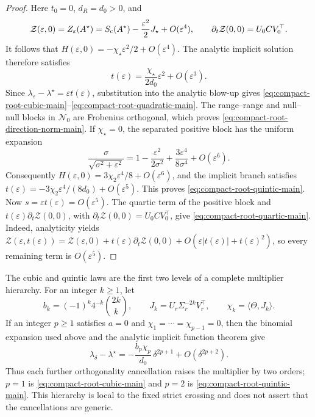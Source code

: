 \begin{proof}
Here \(t_0=0\), \(d_R=d_0>0\), and
\[
 \mathcal Z(\varepsilon,0)=Z_\varepsilon(A^\star)
 =S_{\mathrm c}(A^\star)-\frac{\varepsilon^2}{2}J_\star+O(\varepsilon^4),
 \qquad
 \partial_t\mathcal Z(0,0)=U_0CV_0^\top.
\]
It follows that
\(H(\varepsilon,0)=-\chi_\star\varepsilon^2/2+O(\varepsilon^4)\).
The analytic implicit solution therefore satisfies
\[
 t(\varepsilon)=\frac{\chi_\star}{2d_0}\varepsilon^2
 +O(\varepsilon^3).
\]
Since \(\lambda_\varepsilon-\lambda^\star=\varepsilon t(\varepsilon)\),
substitution into the analytic blow-up gives
\eqref{eq:compact-root-cubic-main}--\eqref{eq:compact-root-quadratic-main}.
The range--range and null--null blocks in \(\mathcal N_0\) are Frobenius
orthogonal, which proves \eqref{eq:compact-root-direction-norm-main}.
If \(\chi_\star=0\), the separated positive block has the uniform expansion
\[
 \frac{\sigma}{\sqrt{\sigma^2+\varepsilon^2}}
 =1-\frac{\varepsilon^2}{2\sigma^2}
  +\frac{3\varepsilon^4}{8\sigma^4}+O(\varepsilon^6).
\]
Consequently
\(H(\varepsilon,0)=3\chi_2\varepsilon^4/8+O(\varepsilon^6)\), and the
implicit branch satisfies
\(t(\varepsilon)=-3\chi_2\varepsilon^4/(8d_0)+O(\varepsilon^5)\).
This proves \eqref{eq:compact-root-quintic-main}.  Now
\(s=\varepsilon t(\varepsilon)=O(\varepsilon^5)\).  The quartic term of
the positive block and
\(t(\varepsilon)\partial_t\mathcal Z(0,0)\), with
\(\partial_t\mathcal Z(0,0)=U_0CV_0^\top\), give
\eqref{eq:compact-root-quartic-main}.  Indeed, analyticity yields
\(\mathcal Z(\varepsilon,t(\varepsilon))
=\mathcal Z(\varepsilon,0)+t(\varepsilon)\partial_t\mathcal Z(0,0)
+O(\varepsilon|t(\varepsilon)|+t(\varepsilon)^2)\), so every remaining
term is \(O(\varepsilon^5)\).
\end{proof}

\begin{remark}
\label{rem:compact-root-hierarchy-main}
The cubic and quintic laws are the first two levels of a complete multiplier
hierarchy.  For an integer \(k\ge1\), let
\[
 b_k=(-1)^k4^{-k}\binom{2k}{k},\qquad
 J_k=U_r\Sigma_r^{-2k}V_r^\top,\qquad
 \chi_k=\langle\Theta,J_k\rangle.
\]
If an integer \(p\ge1\) satisfies
\(a=0\) and \(\chi_1=\cdots=\chi_{p-1}=0\), then the binomial expansion
used above and the analytic implicit function theorem give
\begin{equation}
 \lambda_\delta-\lambda^\star
 =-\frac{b_p\chi_p}{d_0}\,\delta^{2p+1}
  +O(\delta^{2p+2}).
 \label{eq:compact-root-hierarchy-main}
\end{equation}
Thus each further orthogonality cancellation raises the multiplier by two
orders; \(p=1\) is \eqref{eq:compact-root-cubic-main} and \(p=2\) is
\eqref{eq:compact-root-quintic-main}.  This hierarchy is local to the fixed
strict crossing and does not assert that the cancellations are generic.
\end{remark}

